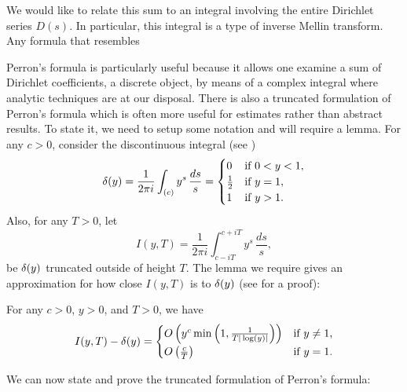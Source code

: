      We would like to relate this sum to an integral involving the entire Dirichlet series $D(s)$. In particular, this integral is a type of inverse Mellin transform. Any formula that resembles  

      Perron's formula is particularly useful because it allows one examine a sum of Dirichlet coefficients, a discrete object, by means of a complex integral where analytic techniques are at our disposal. There is also a truncated formulation of Perron's formula which is often more useful for estimates rather than abstract results. To state it, we need to setup some notation and will require a lemma. For any $c > 0$, consider the discontinuous integral (see \cite{davenport2013multiplicative})
      \[
        \delta(y) = \frac{1}{2\pi i}\int_{(c)}y^{s}\,\frac{ds}{s} = \begin{cases} 0 & \text{if $0 < y < 1$}, \\ \frac{1}{2} & \text{if $y = 1$}, \\ 1 & \text{if $y > 1$}. \end{cases}
      \]
      Also, for any $T > 0$, let
      \[
        I(y,T) = \frac{1}{2\pi i}\int_{c-iT}^{c+iT}y^{s}\,\frac{ds}{s},
      \]
      be $\delta(y)$ truncated outside of height $T$. The lemma we require gives an approximation for how close $I(y,T)$ is to $\delta(y)$ (see \cite{davenport2013multiplicative} for a proof):

      \begin{lemma}\label{lem:delta_truncation_estimate}
        For any $c > 0$, $y > 0$, and $T > 0$, we have
        \[
          I(y,T)-\delta(y) = \begin{cases} O\left(y^{c}\min\left(1,\frac{1}{T|\log(y)|}\right)\right) & \text{if $y \neq 1$}, \\ O\left(\frac{c}{T}\right) & \text{if $y = 1$}. \end{cases}
        \]
      \end{lemma}

      We can now state and prove the truncated formulation of Perron's formula:

